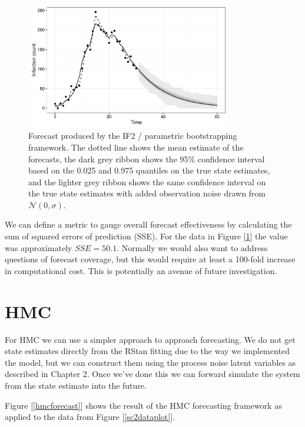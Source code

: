 	\begin{figure}
        \centering
        \captionsetup{width=.8\linewidth}
        \includegraphics[width=0.8\textwidth]{./images/if2combined.pdf}
        \caption{Forecast produced by the IF2 / parametric bootstrapping framework. The dotted line shows the mean estimate of the forecasts, the dark grey ribbon shows the 95\% confidence interval based on the 0.025 and 0.975 quantiles on the true state estimates, and the lighter grey ribbon shows the same confidence interval on the true state estimates with added observation noise drawn from $\mathcal{N}(0,\sigma)$. \label{if2combined}}
    \end{figure}

    We can define a metric to gauge overall forecast effectiveness by calculating the sum of squared errors of prediction (SSE). For the data in Figure [\ref{if2combined}] the value was approximately $SSE = 50.1$. Normally we would also want to address questions of forecast coverage, but this would require at least a 100-fold increase in computational cost. This is potentially an avenue of future investigation.
    

\section{HMC}

	For HMC we can use a simpler approach to approach forecasting. We do not get state estimates directly from the RStan fitting due to the way we implemented the model, but we can construct them using the process noise latent variables as described in Chapter 2. Once we've done this we can forward simulate the system from the state estimate into the future.

	 Figure [\ref{hmcforecast}] shows the result of the HMC forecasting framework as applied to the data from Figure [\ref{sc2dataplot}].

